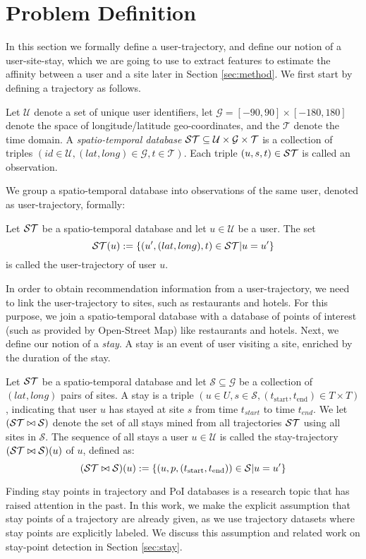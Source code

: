 \section{Problem Definition} 
\label{sec:probdef}
In this section we formally define a user-trajectory, and define our notion of a user-site-stay, which we are going
to use to extract features to estimate the affinity between a user and a site later in Section \ref{sec:method}.
We first start by defining a trajectory as follows.
\begin{definition}
Let $\mathcal{U}$ denote a set of unique user identifiers, let $\mathcal{G}=[-90,90]\times [-180,180]$ denote the space of longitude/latitude geo-coordinates, and the $\mathcal{T}$ denote the time domain.
A \emph{spatio-temporal database} $\mathcal{ST}\subseteq \mathcal{U}\times \mathcal{G}\times \mathcal{T}$ is a collection of triples $(id\in\mathcal{U},(lat,long)\in\mathcal{G},t\in\mathcal{T})$. Each triple $(u,s,t)\in\mathcal{ST}$ is called an observation.
\end{definition}
We group a spatio-temporal database into observations of the same user, denoted as user-trajectory, formally:
\begin{definition}
Let $\mathcal{ST}$ be a spatio-temporal database and let $u\in\mathcal{U}$ be a user. The set
$$
\mathcal{ST}(u):=\{(u^\prime,(lat,long),t)\in\mathcal{ST}|u=u^\prime\}
$$
is called the user-trajectory of user $u$.
\end{definition}
In order to obtain recommendation information from a user-trajectory, we need to link the user-trajectory to sites, such as restaurants and hotels. For this purpose, we join a spatio-temporal database with a database of points of interest (such as provided by Open-Street Map) like restaurants and hotels. Next, we define our notion of a \emph{stay}. A stay is an event of user visiting a site, enriched by the duration of the stay.
\begin{definition}
Let $\mathcal{ST}$ be a spatio-temporal database and let $\mathcal{S}\subseteq \mathcal{G}$ be a collection of $(lat,long)$ pairs of sites. A stay is a triple $(u\in U,s\in\mathcal{S},(t_\text{start},t_\text{end})\in T\times T)$, indicating that user $u$ has stayed at site $s$ from time $t_{start}$ to time $t_{end}$.
We let $(\mathcal{ST}\bowtie\mathcal{S})$ denote the set of all stays mined from all trajectories $\mathcal{ST}$ using all sites in $\mathcal{S}$.
The sequence of all stays a user $u\in\mathcal{U}$ is called the stay-trajectory $(\mathcal{ST}\bowtie\mathcal{S})(u)$ of $u$, defined as:
$$
(\mathcal{ST}\bowtie\mathcal{S})(u):=\{(u,p,(t_\text{start},t_\text{end}))\in\mathcal{S}|u=u^\prime\}
$$
\end{definition}
Finding stay points in trajectory and PoI databases is a research topic that has raised attention in the past. In this work, we make the explicit assumption that stay points of a trajectory are already given, as we use trajectory datasets where stay points are explicitly labeled. We discuss this assumption and related work on stay-point detection in Section \ref{sec:stay}.

